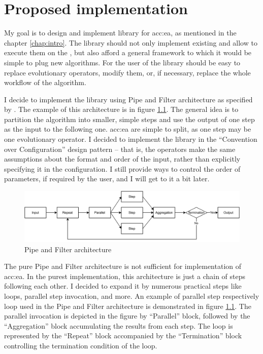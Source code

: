 \chapter{Proposed implementation}
\label{chap:impl}

My goal is to design and implement library for \acrlong{acc:ea}, as mentioned in the chapter \ref{chap:intro}. The library should not only implement existing  and allow to execute them on the \gpuns, but also afford a general framework to which it would be simple to plug new algorithms. For the user of the library should be easy to replace evolutionary operators, modify them, or, if necessary, replace the whole workflow of the algorithm.

I decide to implement the library using Pipe and Filter architecture as specified by \citet{EnterpriseIntegrationPatterns}. The example of this architecture is in figure \ref{fig:pipesandfilters}. The general idea is to partition the algorithm into smaller, simple steps and use the output of one step as the input to the following one. \acrshort{acc:ea} are simple to split, as one step may be one evolutionary operator. I decided to implement the library in the \enquote{Convention over Configuration} design pattern -- that is, the operators make the same assumptions about the format and order of the input, rather than explicitly specifying it in the configuration. I still provide ways to control the order of parameters, if required by the user, and I will get to it a bit later.

\begin{figure}
    \centering
    \includegraphics[width=\textwidth]{img/PipesAndFilters.pdf}
    \caption{Pipe and Filter architecture}
    \label{fig:pipesandfilters}
\end{figure}

The pure Pipe and Filter architecture is not sufficient for implementation of \acrshort{acc:ea}. In the purest implementation, this architecture is just a chain of steps following each other. I decided to expand it by numerous practical steps like loops, parallel step invocation, and more. An example of parallel step respectively loop used in the Pipe and Filter architecture is demonstrated in figure \ref{fig:pipesandfilters}. The parallel invocation is depicted in the figure by \enquote{Parallel} block, followed by the \enquote{Aggregation} block accumulating the results from each step. The loop is represented by the \enquote{Repeat} block accompanied by the \enquote{Termination} block controlling the termination condition of the loop.

